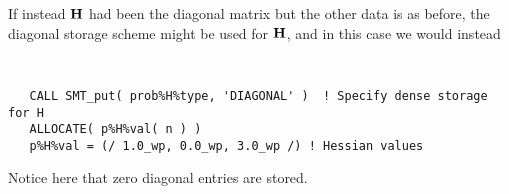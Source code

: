\documentclass{galahad}
\begin{document}
If instead ${\mathbf{H}}$ had been the diagonal matrix
but the other data is as before, the diagonal storage scheme
might be used for ${\mathbf{H}}$, and in this case we would instead
{\tt \small
\begin{verbatim}
   CALL SMT_put( prob%H%type, 'DIAGONAL' )  ! Specify dense storage for H
   ALLOCATE( p%H%val( n ) )
   p%H%val = (/ 1.0_wp, 0.0_wp, 3.0_wp /) ! Hessian values
\end{verbatim}
}
\noindent
Notice here that zero diagonal entries are stored.
\end{document}
